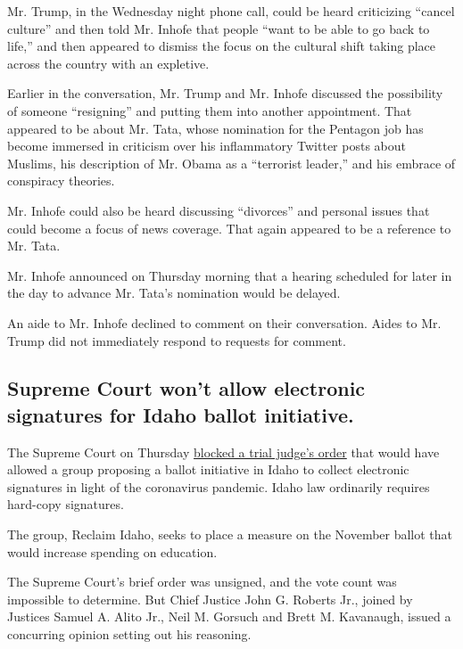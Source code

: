 Mr. Trump, in the Wednesday night phone call, could be heard criticizing
``cancel culture'' and then told Mr. Inhofe that people ``want to be
able to go back to life,'' and then appeared to dismiss the focus on the
cultural shift taking place across the country with an expletive.

Earlier in the conversation, Mr. Trump and Mr. Inhofe discussed the
possibility of someone ``resigning'' and putting them into another
appointment. That appeared to be about Mr. Tata, whose nomination for
the Pentagon job has become immersed in criticism over his inflammatory
Twitter posts about Muslims, his description of Mr. Obama as a
``terrorist leader,'' and his embrace of conspiracy theories.

Mr. Inhofe could also be heard discussing ``divorces'' and personal
issues that could become a focus of news coverage. That again appeared
to be a reference to Mr. Tata.

Mr. Inhofe announced on Thursday morning that a hearing scheduled for
later in the day to advance Mr. Tata's nomination would be delayed.

An aide to Mr. Inhofe declined to comment on their conversation. Aides
to Mr. Trump did not immediately respond to requests for comment.

\hypertarget{supreme-court-wont-allow-electronic-signatures-for-idaho-ballot-initiative}{%
\subsection{Supreme Court won't allow electronic signatures for Idaho
ballot
initiative.}\label{supreme-court-wont-allow-electronic-signatures-for-idaho-ballot-initiative}}

The Supreme Court on Thursday
\href{https://www.supremecourt.gov/opinions/19pdf/20a18_f2qg.pdf}{blocked
a trial judge's order} that would have allowed a group proposing a
ballot initiative in Idaho to collect electronic signatures in light of
the coronavirus pandemic. Idaho law ordinarily requires hard-copy
signatures.

The group, Reclaim Idaho, seeks to place a measure on the November
ballot that would increase spending on education.

The Supreme Court's brief order was unsigned, and the vote count was
impossible to determine. But Chief Justice John G. Roberts Jr., joined
by Justices Samuel A. Alito Jr., Neil M. Gorsuch and Brett M. Kavanaugh,
issued a concurring opinion setting out his reasoning.


